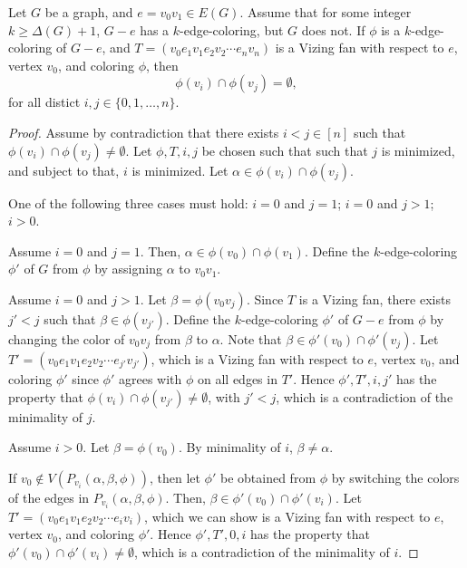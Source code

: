\begin{lemma} \label{lem:vizing-fan-disjoint-colors}
    Let \(G\) be a graph, and \(e = v_0v_1 \in E(G)\).
    Assume that for some integer \(k \geq \Delta(G) + 1\),
    \(G - e\) has a \(k\)-edge-coloring, but \(G\) does not.
    If \(\phi\) is a \(k\)-edge-coloring of \(G - e\),
    and \(T = (v_0e_1v_1e_2v_2 \cdots e_nv_n)\) is a Vizing fan
    with respect to \(e\), vertex \(v_0\), and coloring \(\phi\),
    then
    \begin{equation}
        \phi(v_i) \cap \phi(v_j) = \emptyset,
    \end{equation}
    for all distict \(i, j \in \{0, 1, \ldots, n\}\).
\end{lemma}

\begin{proof}
    Assume by contradiction that there exists \(i < j \in [n]\) such that \(\phi(v_i) \cap \phi(v_j) \neq \emptyset\).
    Let \(\phi, T, i, j\) be chosen such that such that
    \(j\) is minimized, and subject to that,
    \(i\) is minimized.
    Let \(\alpha \in \phi(v_i) \cap \phi(v_j)\).

    One of the following three cases must hold:
    \(i = 0\) and \(j = 1\);
    \(i = 0\) and \(j > 1\);
    \(i > 0\).

    Assume \(i = 0\) and \(j = 1\).
    Then, \(\alpha \in \phi(v_0) \cap \phi(v_1)\).
    Define the \(k\)-edge-coloring \(\phi'\) of \(G\)
    from \(\phi\) by
    assigning \(\alpha\) to \(v_0v_1\).

    Assume \(i = 0\) and \(j > 1\).
    Let \(\beta = \phi(v_0v_j)\).
    Since \(T\) is a Vizing fan, there exists \(j' < j\) such that \(\beta \in \phi(v_{j'})\).
    Define the \(k\)-edge-coloring \(\phi'\) of \(G - e\)
    from \(\phi\) by
    changing the color of \(v_0v_j\) from \(\beta\) to \(\alpha\).
    Note that \(\beta \in \phi'(v_0) \cap \phi'(v_j)\).
    Let \(T' = (v_0e_1v_1e_2v_2 \cdots e_{j'}v_{j'})\),
    which is a Vizing fan with respect to \(e\), vertex \(v_0\), and coloring \(\phi'\)
    since \(\phi'\) agrees with \(\phi\) on all edges in \(T'\).
    Hence \(\phi', T', i, j'\) has the property that \(\phi(v_i) \cap \phi(v_{j'}) \neq \emptyset\), with \(j' < j\), which is a contradiction of the minimality of \(j\).

    Assume \(i > 0\).
    Let \(\beta = \phi(v_0)\).
    By minimality of \(i\), \(\beta \neq \alpha\).

    If \(v_0 \notin V(P_{v_i}(\alpha, \beta, \phi))\),
    then let \(\phi'\) be obtained from \(\phi\) by
    switching the colors of the edges in \(P_{v_i}(\alpha, \beta, \phi)\).
    Then, \(\beta \in \phi'(v_0) \cap \phi'(v_i)\).
    Let \(T' = (v_0e_1v_1e_2v_2 \cdots e_iv_i)\),
    which we can show is a Vizing fan with respect to \(e\), vertex \(v_0\), and coloring \(\phi'\).
    Hence \(\phi', T', 0, i\) has the property that \(\phi'(v_0) \cap \phi'(v_i) \neq \emptyset\), which is a contradiction of the minimality of \(i\).


\end{proof}
